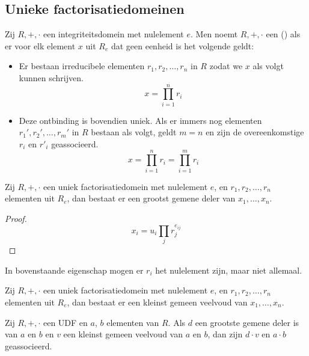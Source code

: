 \documentclass[main.tex]{subfiles}
\begin{document}
\subsection{Unieke factorisatiedomeinen}
\label{sec:unieke-fact}

\begin{de}
  Zij $R,+,\cdot$ een integriteitsdomein met nulelement $e$.
  Men noemt $R,+,\cdot$ een  () als er voor elk element $x$ uit $R_{e}$ dat geen eenheid is het volgende geldt:
  \begin{itemize}
  \item Er bestaan irreducibele elementen $r_{1},r_{2},\dotsc,r_{n}$ in $R$ zodat we $x$ als volgt kunnen schrijven.
    \[ x = \prod_{i=1}^{n} r_{i} \]
  \item Deze ontbinding is bovendien uniek.
    Als er immers nog elementen $r_{1}',r_{2}',\dotsc,r_{m}'$ in $R$ bestaan als volgt, geldt $m=n$ en zijn de overeenkomstige $r_{i}$ en $r'_{i}$ geassocieerd.
    \[ x = \prod_{i=1}^{n} r_{i} = \prod_{i=1}^{m} r_{i} \]
  \end{itemize}
\end{de}

\begin{ei}
  Zij $R,+,\cdot$ een uniek factorisatiedomein met nulelement $e$, en $r_{1},r_{2},\dotsc,r_{n}$ elementen uit $R_{e}$, dan bestaat er een grootst gemene deler van $x_{1},\dotsc,x_{n}$.
  \begin{proof}
  \[ x_{i} = u_{i}\prod_{j}r_{j}^{e_{ij}} \]
\waarom
{}    
  \end{proof}
\end{ei}

\begin{opm}
  In bovenstaande eigenschap mogen er $r_{i}$ het nulelement zijn, maar niet allemaal.
\end{opm}

\begin{ei}
  Zij $R,+,\cdot$ een uniek factorisatiedomein met nulelement $e$, en $r_{1},r_{2},\dotsc,r_{n}$ elementen uit $R_{e}$, dan bestaat er een kleinst gemeen veelvoud van $x_{1},\dotsc,x_{n}$.
\end{ei}

\begin{st}
  Zij $R,+,\cdot$ een UDF en $a$, $b$ elementen van $R$.
  Als $d$ een grootste gemene deler is van $a$ en $b$ en $v$ een kleinst gemeen veelvoud van $a$ en $b$, dan zijn $d\cdot v$ en $a\cdot b$ geassocieerd.
\end{st}
\end{document}

